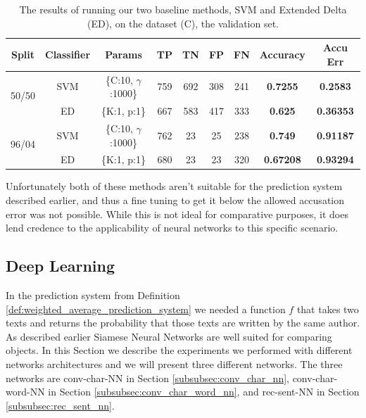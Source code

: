 \begin{table}[h]
\centering
\begin{tabular}{|c|c|c|c|c|c|c||c|c|}
\hline
Split & Classifier & Params & TP & TN & FP & FN & \textbf{Accuracy} & \textbf{Accu Err} \\ \hline
\multirow{2}{*}{50/50} & SVM & \{C:10, $\gamma$:1000\} &  759 & 692 & 308 & 241 & \textbf{0.7255} & \textbf{0.2583} \\ \cline{2-9} 
 & ED & \{K:1, p:1\} & 667 & 583 & 417 & 333 & \textbf{0.625} & \textbf{0.36353} \\ \hline
\multirow{2}{*}{96/04} & SVM & \{C:10, $\gamma$:1000\} & 762 & 23 & 25 & 238 & \textbf{0.749} & \textbf{0.91187} \\ \cline{2-9} 
 & ED & \{K:1, p:1\} & 680 & 23 & 23 & 320 & \textbf{0.67208} & \textbf{0.93294} \\ \hline
\end{tabular}
\caption{The results of running our two baseline methods, SVM and Extended Delta
(ED), on the dataset (C), the validation set. }
\label{tab:baseline-val-res}
\end{table}

Unfortunately both of these methods aren't suitable for the prediction system
described earlier, and thus a fine tuning to get it below the allowed accusation
error was not possible. While this is not ideal for comparative purposes, it
does lend credence to the applicability of neural networks to this specific
scenario.

\subsection{Deep Learning}

In the prediction system from Definition
\ref{def:weighted_average_prediction_system} we needed a function $f$ that
takes two texts and returns the probability that those texts are written
by the same author. As described earlier Siamese Neural Networks are well
suited for comparing objects. In this Section we describe the experiments
we performed with different networks architectures and we will present
three different networks. The three networks are \gls{conv-char-NN} in
Section \ref{subsubsec:conv_char_nn}, \gls{conv-char-word-NN} in Section
\ref{subsubsec:conv_char_word_nn}, and \gls{rec-sent-NN} in Section
\ref{subsubsec:rec_sent_nn}.

